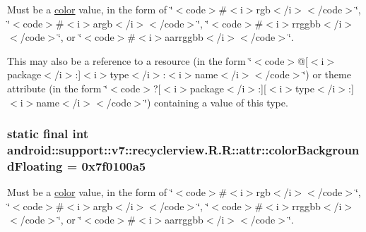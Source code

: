 Must be a \hyperlink{classandroid_1_1support_1_1v7_1_1recyclerview_1_1_r_1_1color}{color} value, in the form of \char`\"{}$<$code$>$\#$<$i$>$rgb$<$/i$>$$<$/code$>$\char`\"{}, \char`\"{}$<$code$>$\#$<$i$>$argb$<$/i$>$$<$/code$>$\char`\"{}, \char`\"{}$<$code$>$\#$<$i$>$rrggbb$<$/i$>$$<$/code$>$\char`\"{}, or \char`\"{}$<$code$>$\#$<$i$>$aarrggbb$<$/i$>$$<$/code$>$\char`\"{}. 

This may also be a reference to a resource (in the form \char`\"{}$<$code$>$@\mbox{[}$<$i$>$package$<$/i$>$:\mbox{]}$<$i$>$type$<$/i$>$:$<$i$>$name$<$/i$>$$<$/code$>$\char`\"{}) or theme attribute (in the form \char`\"{}$<$code$>$?\mbox{[}$<$i$>$package$<$/i$>$:\mbox{]}\mbox{[}$<$i$>$type$<$/i$>$:\mbox{]}$<$i$>$name$<$/i$>$$<$/code$>$\char`\"{}) containing a value of this type. \hypertarget{classandroid_1_1support_1_1v7_1_1recyclerview_1_1_r_1_1attr_221d59fb6d8e872d81d7a7f97aa8ef82}{
\subsubsection[{colorBackgroundFloating}]{\setlength{\rightskip}{0pt plus 5cm}static final int android::support::v7::recyclerview.R.R::attr::colorBackgroundFloating = 0x7f0100a5}}
\label{classandroid_1_1support_1_1v7_1_1recyclerview_1_1_r_1_1attr_221d59fb6d8e872d81d7a7f97aa8ef82}


Must be a \hyperlink{classandroid_1_1support_1_1v7_1_1recyclerview_1_1_r_1_1color}{color} value, in the form of \char`\"{}$<$code$>$\#$<$i$>$rgb$<$/i$>$$<$/code$>$\char`\"{}, \char`\"{}$<$code$>$\#$<$i$>$argb$<$/i$>$$<$/code$>$\char`\"{}, \char`\"{}$<$code$>$\#$<$i$>$rrggbb$<$/i$>$$<$/code$>$\char`\"{}, or \char`\"{}$<$code$>$\#$<$i$>$aarrggbb$<$/i$>$$<$/code$>$\char`\"{}. 

